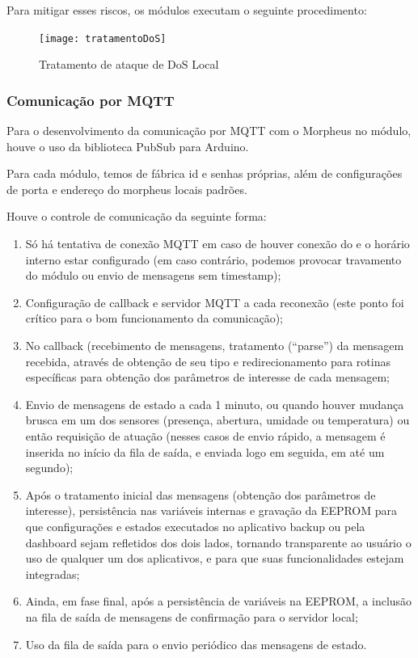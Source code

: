 Para mitigar esses riscos, os módulos executam o seguinte procedimento:

\begin{figure}[H]
	\centering
	\caption{Tratamento de ataque de DoS Local}
  \texttt{[image: tratamentoDoS]}
\label{fig:tratamentoDoS}
\end{figure}

\subsubsection{Comunicação por MQTT}
Para o desenvolvimento da comunicação por MQTT com o Morpheus no módulo, houve o uso da biblioteca PubSub para Arduino.

Para cada módulo, temos de fábrica id e senhas próprias, além de configurações de porta e endereço do morpheus locais padrões.

Houve o controle de comunicação da seguinte forma:

\begin{enumerate}
	\item Só há tentativa de conexão MQTT em caso de houver conexão do \wwifi e o horário interno estar configurado (em caso contrário, podemos provocar travamento do módulo ou envio de mensagens sem timestamp);
	\item Configuração de callback e servidor MQTT a cada reconexão (este ponto foi crítico para o bom funcionamento da comunicação);
	\item No callback (recebimento de mensagens, tratamento (“parse”) da mensagem recebida, através de obtenção de seu tipo e redirecionamento para rotinas específicas para obtenção dos parâmetros de interesse de cada mensagem;
	\item Envio de mensagens de estado a cada 1 minuto, ou quando houver mudança brusca em um dos sensores (presença, abertura, umidade ou temperatura) ou então requisição de atuação (nesses casos de envio rápido, a mensagem é inserida no início da fila de saída, e enviada logo em seguida, em até um segundo);
	\item Após o tratamento inicial das mensagens (obtenção dos parâmetros de interesse), persistência nas variáveis internas e gravação da EEPROM para que configurações e estados executados no aplicativo backup ou pela dashboard sejam refletidos dos dois lados, tornando transparente ao usuário o uso de qualquer um dos aplicativos, e para que suas funcionalidades estejam integradas;
	\item Ainda, em fase final, após a persistência de variáveis na EEPROM, a inclusão na fila de saída de mensagens de confirmação para o servidor local;
	\item Uso da fila de saída para o envio periódico das mensagens de estado.
\end{enumerate}

